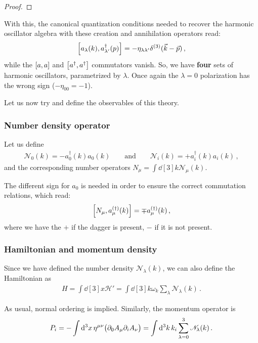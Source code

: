 \documentclass[main.tex]{subfiles}
\begin{document}
\begin{proof}
\end{proof}

With this, the canonical quantization conditions needed to recover the harmonic oscillator algebra with these creation and annihilation operators read: 
%
\begin{align}
\qty[a_{\lambda } (k), a ^\dag_{\lambda '} (p)] = - \eta_{\lambda \lambda'} \delta^{(3)} (\vec{k} - \vec{p})
\,,
\end{align}
%
while the \(\qty[a, a]\) and \(\qty[a ^\dag, a ^\dag]\) commutators vanish. So, we have \textbf{four} sets of harmonic oscillators, parametrized by \(\lambda \). 
Once again the \(\lambda = 0\) polarization has the wrong sign (\(- \eta_{00 } = -1\)). 

Let us now try and define the observables of this theory. 

\subsubsection{Number density operator}

Let us define 
%
\begin{align}
\mathscr{N}_{0}(k) = - a_0  ^\dag (k) a_0 (k)
\qquad \text{and} \qquad
\mathscr{N}_{i}(k) = + a_i  ^\dag (k) a_i (k)
\,,
\end{align}
%
and the corresponding number operators \(N_{\mu } = \int \dd[3]{k} \mathscr{N}_{\mu } (k) \).

The different sign for \(a_0 \) is needed in order to ensure the correct commutation relations, which read: 
%
\begin{align}
\qty[N_{\mu }, a_\mu^{(\dag)}(k)] = \mp a_{\mu }^{(\dag)}(k)
\,,
\end{align}
%
where we have the \(+\) if the dagger is present, \(-\) if it is not present. 

\subsubsection{Hamiltonian and momentum density}

Since we have defined the number density \(\mathscr{N}_{\lambda } (k)\), we can also define the Hamiltonian as 
%
\begin{align}
H = \int \dd[3]{x} \mathscr{H}' = 
\int \dd[3]{k} \omega_{k} \sum _{\lambda } \mathscr{N}_{\lambda } (k)
\,.
\end{align}

As usual, normal ordering is implied. Similarly, the momentum operator is 
%
\begin{align}
P_{i} = - \int \dd[3]{x} \eta^{\mu \nu } \qty(\partial_0 A_{\mu } \partial_{i} A_{\nu }) 
= \int \dd[3]{k} k_i \sum _{\lambda=0}^{3} \mathscr{N}_{\lambda } (k)
\,.
\end{align}
\end{document}
